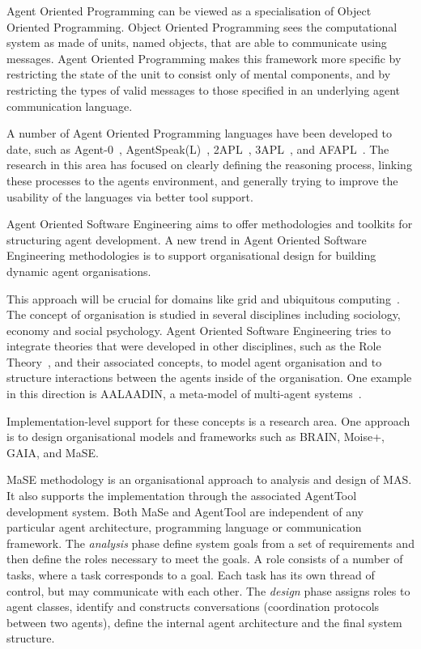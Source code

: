 \documentclass[a4paper,12pt,oneside,fleqn]{book} %
\theoremstyle{plain}
\theoremstyle{definition}
\theoremstyle{remark}
\begin{document}
Agent Oriented Programming can be viewed as a specialisation of Object
Oriented Programming\null. Object Oriented Programming sees the
computational system as made of units, named objects, that are able to
communicate using messages. Agent Oriented Programming makes this framework
more specific by restricting the state of the unit to consist only of
mental components, and by restricting the types of valid messages to those
specified in an underlying agent communication language.

A number of Agent Oriented Programming languages have been developed to
date, such as Agent-0~\cite{DBLP:journals/ai/Shoham93},
AgentSpeak(L)~\cite{DBLP:conf/maamaw/Rao96},
2APL~\cite{DBLP:journals/aamas/Dastani08},
3APL~\cite{DBLP:conf/promas/DastaniRDM03}, and
AFAPL~\cite{DBLP:conf/seke/CollierOR04}. The research in this area has
focused on clearly defining the reasoning process, linking these processes
to the agents environment, and generally trying to improve the usability of
the languages via better tool support.

Agent Oriented Software Engineering aims to offer methodologies and
toolkits for structuring agent development. A new trend in Agent Oriented
Software Engineering methodologies is to support organisational design for
building dynamic agent organisations.

This approach will be crucial for domains like grid and ubiquitous
computing~\cite{luck2005agent}. The concept of organisation is studied in
several disciplines including sociology, economy and social psychology.
Agent Oriented Software Engineering tries to integrate theories that were
developed in other disciplines, such as the Role
Theory~\cite{biddle1986recent}, and their associated concepts, to model
agent organisation and to structure interactions between the agents inside
of the organisation. One example in this direction is AALAADIN, a
meta-model of multi-agent systems~\cite{ferber1998meta}.

Implementation-level support for these concepts is a research area. One
approach is to design organisational models and frameworks such as BRAIN, Moise+, GAIA, and MaSE.

MaSE methodology \cite{deloach2004mase} is an organisational approach to
analysis and design of MAS. It also supports the implementation through the
associated AgentTool development system. Both MaSe and AgentTool are
independent of any particular agent architecture, programming language or
communication framework. The \emph{analysis} phase define system goals from
a set of requirements and then define the roles necessary to meet the
goals. A role consists of a number of tasks, where a task corresponds to a
goal. Each task has its own thread of control, but may communicate with
each other. The \emph{design} phase assigns roles to agent classes,
identify and constructs conversations (coordination protocols between two
agents), define the internal agent architecture and the final system
structure.
\end{document}
